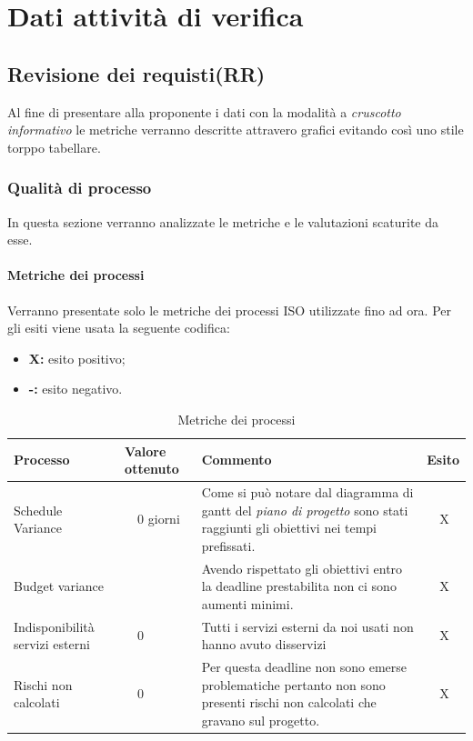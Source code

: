 \section{Dati attività di verifica}
\subsection{Revisione dei requisti(RR)}
Al fine di presentare alla proponente i dati con la modalità a \textit{cruscotto informativo} le metriche verranno descritte attravero grafici evitando così uno stile torppo tabellare.
\subsubsection{Qualità di processo}
In questa sezione verranno analizzate le metriche e le valutazioni scaturite da esse.
\clearpage
\paragraph{Metriche dei processi}
\hspace{10cm} %
\newline Verranno presentate solo le metriche dei processi ISO utilizzate fino ad ora.
Per gli esiti viene usata la seguente codifica:
\begin{itemize}
	\item \textbf{X: } esito positivo;
	\item \textbf{-: } esito negativo.
\end{itemize}
\begin{table}[!htbp]
	\centering
	\renewcommand{\arraystretch}{2} 
	\begin{tabular}{|l|p{2cm}|p{7cm}|l|}
		\rowcolor{orange!50}
		\hline
		\textbf{Processo} & \textbf{Valore ottenuto} & \textbf{Commento} & \textbf{Esito} \\
		\hline
		Schedule Variance & ~~0 giorni & Come si può notare dal diagramma di gantt del \textit{piano di progetto} sono stati raggiunti gli obiettivi nei tempi prefissati. & ~~X \\
		\hline
		Budget variance & ~~\EUR{ -5} & Avendo rispettato gli obiettivi entro la deadline prestabilita non ci sono aumenti minimi. &  ~~X \\
		\hline
		{Indisponibilità servizi esterni} & ~~0 & Tutti i servizi esterni da noi usati non hanno avuto disservizi  & ~~X\\
		\hline
		Rischi non calcolati & ~~0 & Per questa deadline non sono emerse problematiche pertanto non sono presenti rischi non calcolati che gravano sul progetto. & ~~X\\
		\hline
	\end{tabular}
	\caption{Metriche dei processi}
\end{table}
\clearpage
